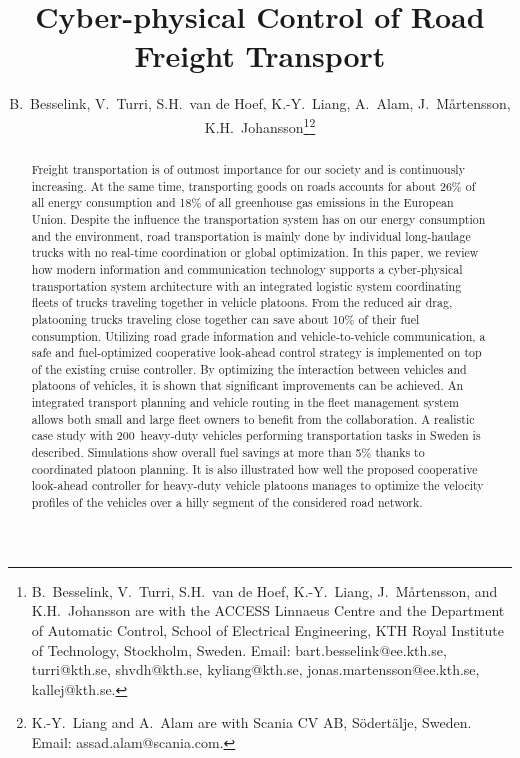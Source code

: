 \documentclass[journal]{IEEEtran}
\title{Cyber-physical Control of Road Freight Transport}
\author{B.~Besselink, V.~Turri, S.H.~van de Hoef, K.-Y.~Liang, A.~Alam, J.~M{\aa}rtensson, K.H.~Johansson\thanks{B.~Besselink, V.~Turri, S.H.~van de Hoef, K.-Y.~Liang, J.~M{\aa}rtensson, and K.H.~Johansson are with the ACCESS Linnaeus Centre and the Department of Automatic Control, School of Electrical Engineering, KTH Royal Institute of Technology, Stockholm, Sweden. Email: bart.besselink@ee.kth.se, turri@kth.se, shvdh@kth.se, kyliang@kth.se, jonas.martensson@ee.kth.se, kallej@kth.se.}\thanks{K.-Y.~Liang and A.~Alam are with Scania CV AB, S\"{o}dert\"{a}lje, Sweden. Email: assad.alam@scania.com.}}
\begin{document}
\maketitle


\begin{abstract}
Freight transportation is of outmost importance for our society and is continuously increasing. At the same time, transporting goods on roads accounts for about 26\% of all energy consumption and 18\% of all greenhouse gas emissions in the European Union. Despite the influence the transportation system has on our energy consumption and the environment, road transportation is mainly done by individual long-haulage trucks with no real-time coordination or global optimization. In this paper, we review how modern information and communication technology supports a cyber-physical transportation system architecture with an integrated logistic system coordinating fleets of trucks traveling together in vehicle platoons. From the reduced air drag, platooning trucks traveling close together can save about 10\% of their fuel consumption. Utilizing road grade information and vehicle-to-vehicle communication, a safe and fuel-optimized cooperative look-ahead control strategy is implemented on top of the existing cruise controller. By optimizing the interaction between vehicles and platoons of vehicles, it is shown that significant improvements can be achieved. An integrated transport planning and vehicle routing in the fleet management system allows both small and large fleet owners to benefit from the collaboration. A realistic case study with 200~heavy-duty vehicles performing transportation tasks in Sweden is described. Simulations show overall fuel savings at more than 5\% thanks to coordinated platoon planning. It is also illustrated how well the proposed cooperative look-ahead controller for heavy-duty vehicle platoons manages to optimize the velocity profiles of the vehicles over a hilly segment of the considered road network.
\end{abstract}
\end{document}
